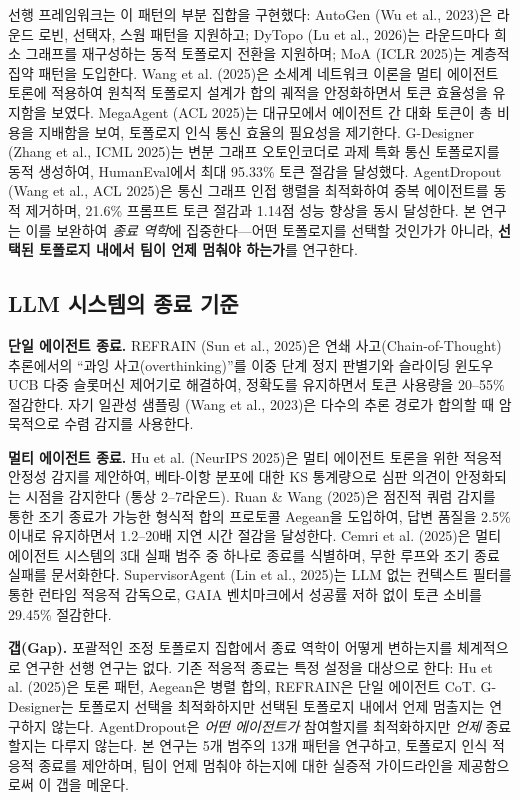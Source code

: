 \documentclass[a4paper,11pt]{article}
\begin{document}
선행 프레임워크는 이 패턴의 부분 집합을 구현했다: AutoGen (Wu et al., 2023)은 라운드 로빈, 선택자, 스웜 패턴을 지원하고; DyTopo (Lu et al., 2026)는 라운드마다 희소 그래프를 재구성하는 동적 토폴로지 전환을 지원하며; MoA (ICLR 2025)는 계층적 집약 패턴을 도입한다. Wang et al. (2025)은 소세계 네트워크 이론을 멀티 에이전트 토론에 적용하여 원칙적 토폴로지 설계가 합의 궤적을 안정화하면서 토큰 효율성을 유지함을 보였다. MegaAgent (ACL 2025)는 대규모에서 에이전트 간 대화 토큰이 총 비용을 지배함을 보여, 토폴로지 인식 통신 효율의 필요성을 제기한다. G-Designer (Zhang et al., ICML 2025)는 변분 그래프 오토인코더로 과제 특화 통신 토폴로지를 동적 생성하여, HumanEval에서 최대 95.33\% 토큰 절감을 달성했다. AgentDropout (Wang et al., ACL 2025)은 통신 그래프 인접 행렬을 최적화하여 중복 에이전트를 동적 제거하며, 21.6\% 프롬프트 토큰 절감과 1.14점 성능 향상을 동시 달성한다. 본 연구는 이를 보완하여 \emph{종료 역학}에 집중한다---어떤 토폴로지를 선택할 것인가가 아니라, \textbf{선택된 토폴로지 내에서 팀이 언제 멈춰야 하는가}를 연구한다.

\subsection{LLM 시스템의 종료 기준}

\textbf{단일 에이전트 종료.} REFRAIN (Sun et al., 2025)은 연쇄 사고(Chain-of-Thought) 추론에서의 ``과잉 사고(overthinking)''를 이중 단계 정지 판별기와 슬라이딩 윈도우 UCB 다중 슬롯머신 제어기로 해결하여, 정확도를 유지하면서 토큰 사용량을 20--55\% 절감한다. 자기 일관성 샘플링 (Wang et al., 2023)은 다수의 추론 경로가 합의할 때 암묵적으로 수렴 감지를 사용한다.

\textbf{멀티 에이전트 종료.} Hu et al. (NeurIPS 2025)은 멀티 에이전트 토론을 위한 적응적 안정성 감지를 제안하여, 베타-이항 분포에 대한 KS 통계량으로 심판 의견이 안정화되는 시점을 감지한다 (통상 2--7라운드). Ruan \& Wang (2025)은 점진적 쿼럼 감지를 통한 조기 종료가 가능한 형식적 합의 프로토콜 Aegean을 도입하여, 답변 품질을 2.5\% 이내로 유지하면서 1.2--20배 지연 시간 절감을 달성한다. Cemri et al. (2025)은 멀티 에이전트 시스템의 3대 실패 범주 중 하나로 종료를 식별하며, 무한 루프와 조기 종료 실패를 문서화한다. SupervisorAgent (Lin et al., 2025)는 LLM 없는 컨텍스트 필터를 통한 런타임 적응적 감독으로, GAIA 벤치마크에서 성공률 저하 없이 토큰 소비를 29.45\% 절감한다.

\textbf{갭(Gap).} 포괄적인 조정 토폴로지 집합에서 종료 역학이 어떻게 변하는지를 체계적으로 연구한 선행 연구는 없다. 기존 적응적 종료는 특정 설정을 대상으로 한다: Hu et al. (2025)은 토론 패턴, Aegean은 병렬 합의, REFRAIN은 단일 에이전트 CoT. G-Designer는 토폴로지 선택을 최적화하지만 선택된 토폴로지 내에서 언제 멈출지는 연구하지 않는다. AgentDropout은 \emph{어떤 에이전트가} 참여할지를 최적화하지만 \emph{언제} 종료할지는 다루지 않는다. 본 연구는 5개 범주의 13개 패턴을 연구하고, 토폴로지 인식 적응적 종료를 제안하며, 팀이 언제 멈춰야 하는지에 대한 실증적 가이드라인을 제공함으로써 이 갭을 메운다.
\end{document}
